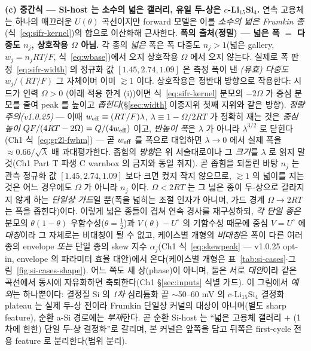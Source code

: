 \textbf{(c) 중간식 --- Si-host 는 소수의 넓은 갤러리, 유일 두-상은 $c$-Li$_{15}$Si$_4$.} 연속 고용체는 하나의
매끄러운 $U(\theta)$ 곡선이지만 forward 모델은 이를 \emph{소수의 넓은 Frumkin 종}(식~\eqref{eq:sifr-kernel})의
합으로 이산화해 근사한다. \textbf{폭의 출처(정밀) --- 넓은 폭 $=$ 다중도 $n_j$, 상호작용 $\Omega$ 아님.} 각 종의
\emph{넓은} 폭은 폭 다중도 $n_j{>}1$(넓은 gallery, $w_j{=}n_jRT/F$, 식~\eqref{eq:wbase})에서 오지 상호작용 $\Omega$
에서 오지 않는다. 실제로 폭 판정~\eqref{eq:sifr-width} 의 정규화 값 $[1.45,2.74,1.09]$ 은 측정 폭이 낸 \emph{(유효)
다중도} $w_j/(RT/F)$ 그 자체이며 이미 $\gtrsim1$ 이다. 상호작용은 정반대 방향으로 작용한다: 시드가 인력 $\Omega{>}0$
(아래 적용 한계 (i))이면 식~\eqref{eq:sifr-kernel} 분모의 $-2\Omega$ 가 중심 분모를 줄여 peak 를 높이고
\emph{좁힌다}(\S\ref{sec:width} 이중지위 첫째 지위와 같은 방향). \emph{정량 주의(v1.0.25)} --- 이때
$w_{\mathrm{eff}}\equiv(RT/F)\lambda$, $\lambda\equiv1-\Omega/2RT$ 가 정확히 재는 것은 \emph{중심 높이}
$QF/(4RT-2\Omega)=Q/(4w_{\mathrm{eff}})$ 이고, \emph{반높이 폭}은 $\lambda$ 가 아니라 $\lambda^{3/2}$ 로 닫힌다
(Ch1 식~\eqref{eq:gr2l-fwhm}) --- 곧 $w_{\mathrm{eff}}$ 를 폭으로 대입하면 $\lambda\to0$ 에서 실제 폭을
$\approx0.66/\sqrt\lambda$ 배 과대평가한다. 좁힘의 \emph{방향}은 위 서술대로이나 그 \emph{크기}를 $\lambda$ 로
읽지 말 것(Ch1 Part T 파생 C warnbox 의 금지와 동일 취지). 곧 좁힘을 되돌린 바탕 $n_j$ 는 관측 정규화 값 $[1.45,2.74,1.09]$ 보다
크면 컸지 작지 않으므로, $\gtrsim1$ 의 넓이를 지는 것은 어느 경우에도 $\Omega$ 가 아니라 $n_j$ 이다. $\Omega<2RT$ 는
그 넓은 종이 두-상으로 갈라지지 않게 하는 \emph{단일상 가드}일 뿐(폭을 넓히는 조절 인자가 아니며, 가드 경계
$\Omega{\to}2RT$ 는 폭을 좁힌다)이다. 이렇게 넓은 종들이 겹쳐 연속 경사를 재구성하되, \emph{각 단일 종은} 분모의
$\theta(1-\theta)$ 우함수성($\theta{=}\tfrac12$)과 $V(\theta){-}U^\circ$ 의 기함수성 때문에 중심 $V{=}U^\circ$ 에
\emph{대칭}이라 그 자체로는 비대칭이 될 수 없고, 케이스별 개형의 \emph{비대칭}은 폭이 다른 여러 종의 envelope
\emph{또는} 단일 종의 skew 지수 $\alpha_j$(Ch1 식~\eqref{eq:skewpeak} --- v1.0.25 opt-in, envelope 의 파라미터
효율 대안)에서 온다(케이스별 개형은 표~\ref{tab:si-cases}$\cdot$그림~\ref{fig:si-cases-shape}). 어느 쪽도 새
상(phase)이 아니며, 둘은 서로 \emph{대안}이라 같은 곡선에서 동시에 자유화하면 축퇴한다(Ch1
\S\ref{sec:inputs} 식별 가드). 이 그림에서 \emph{예외}는
하나뿐이다: 결정질 Si 의 \emph{1차} 심리튬화 끝 $\sim$50--60 mV 의 $c$-Li$_{15}$Si$_4$ 결정화 plateau 는 실제 두-상
전이라\cite{obrovac_christensen2004,ogata_nmr2014} Frumkin 단일상 커널의 대상이 아니며(별도 sharp feature), 순환
a-Si 경로에는 \emph{부재}한다\cite{chevrier_dahn2009}. 곧 순환 Si-host 는 ``넓은 고용체 갤러리 $+$ (1차에 한한)
단일 두-상 결정화''로 갈리며, 본 커널은 앞쪽을 담고 뒤쪽은 first-cycle 전용 feature 로 분리한다(범위 분리).

